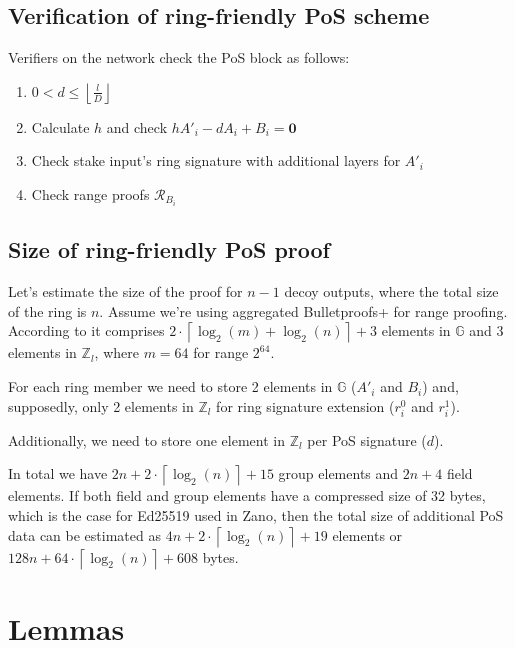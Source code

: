 \documentclass{article}
\newcommand{\floor}[1]{\left\lfloor #1 \right\rfloor}
\newcommand{\ceil}[1]{\left\lceil #1 \right\rceil}
\numberwithin{figure}{section}
\begin{document}
\subsection{Verification of ring-friendly PoS scheme} \label{s_verification_ring_friendly}
Verifiers on the network check the PoS block as follows:

\begin{enumerate}
    \item $0 < d \leq \floor{\frac{l}{D}}$
    
    \item Calculate $h$ and check $h A'_i - d A_i + B_i = \mathbf{0}$
    
    \item Check stake input's ring signature with additional layers for $A'_i$
    
    \item Check range proofs $\mathcal{R}_B_i$
\end{enumerate}


\subsection{Size of ring-friendly PoS proof}

Let's estimate the size of the proof for $n-1$ decoy outputs, where the total size of the ring is $n$. Assume we're using aggregated Bulletproofs+ for range proofing. According to \cite{BP+} it comprises $2 \cdot \ceil{\log_2(m) + \log_2(n)} + 3$ elements in $\mathbb{G}$ and 3 elements in $\mathbb{Z}_l$, where $m = 64$ for range $2^{64}$.

For each ring member we need to store 2 elements in $\mathbb{G}$ ($A'_i$ and $B_i$) and, supposedly, only 2 elements in $\mathbb{Z}_l$ for ring signature extension ($r^0_i$ and $r^1_i$).

Additionally, we need to store one element in $\mathbb{Z}_l$ per PoS signature ($d$).

In total we have $2n + 2 \cdot \ceil{\log_2(n)} + 15$ group elements and $2n + 4$ field elements. If both field and group elements have a compressed size of 32 bytes, which is the case for Ed25519 used in Zano, then the total size of additional PoS data can be estimated as $4n + 2 \cdot \ceil{\log_2(n)} + 19$ elements or $128n + 64 \cdot \ceil{\log_2(n)} + 608$ bytes.

%
%
\printbibliography


\newpage
\appendix
\section{Lemmas}
\end{document}
